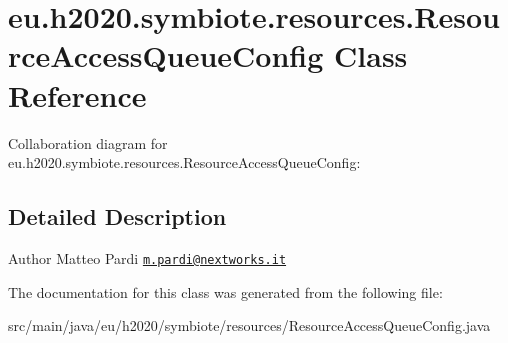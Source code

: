 \hypertarget{classeu_1_1h2020_1_1symbiote_1_1resources_1_1ResourceAccessQueueConfig}{}\section{eu.\+h2020.\+symbiote.\+resources.\+Resource\+Access\+Queue\+Config Class Reference}
\label{classeu_1_1h2020_1_1symbiote_1_1resources_1_1ResourceAccessQueueConfig}


Collaboration diagram for eu.\+h2020.\+symbiote.\+resources.\+Resource\+Access\+Queue\+Config\+:


\subsection{Detailed Description}
\begin{DoxyAuthor}{Author}
Matteo Pardi \href{mailto:m.pardi@nextworks.it}{\tt m.\+pardi@nextworks.\+it} 
\end{DoxyAuthor}


The documentation for this class was generated from the following file\+:\begin{DoxyCompactItemize}
\item 
src/main/java/eu/h2020/symbiote/resources/Resource\+Access\+Queue\+Config.\+java\end{DoxyCompactItemize}
